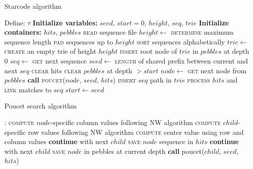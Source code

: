\documentclass[10pt,onecolumn]{article}
\begin{document}
\begin{algorithm}
  \caption{Starcode algorithm}
  \label{alg:starcode}
  \begin{algorithmic}[1]
    \State Define: $\tau$
    \State \textbf{Initialize variables:} $seed$, $start = 0$,
    $height$, $seq$, $trie$
    \State \textbf{Initialize containers:} $hits$, $pebbles$
    \State \textsc{read} sequence file
    \State $height \gets$ \textsc{determine} maximum sequence length
    \State \textsc{pad} sequences up to $height$
    \State \textsc{sort} sequences alphabetically
    \State $trie \gets$ \textsc{create} an empty trie of height $height$
    \State \textsc{insert} root node of $trie$ in $pebbles$ at depth 0
    \State $seq \gets$ \textsc{get} next sequence
    \State $seed \gets$ \textsc{length} of shared prefix
    between current and next $seq$
    \State \textsc{clear} hits
    \State \textsc{clear} $pebbles$ at depth $>start$
    \State $node \gets$ \textsc{get} next node from $pebbles$
    \State \textbf{call} \textsc{poucet}($node$, $seed$, $hits$)
    \EndFor
    \State \textsc{insert} $seq$ path in $trie$
    \State \textsc{process} $hits$ and \textsc{link} matches to $seq$
    \State $start \gets seed$
    \EndFor
  \end{algorithmic}
\end{algorithm}


\begin{algorithm}
  \caption{Poucet search algorithm}
  \label{alg:poucet}
  \begin{algorithmic}[1]
    :
    \State \textsc{compute} $node$-specific column values following NW algorithm
    \State \textsc{compute} $child$-specific row values following NW algorithm
    \State \textsc{compute} center value using row and column
    values
     
    \State \textbf{continue} with next $child$
    \EndIf
     
    \State \textsc{save} $node$ sequence in $hits$
    \State \textbf{continue} with next $child$
    \EndIf
    \State \textsc{save} $node$ in pebbles at current depth
    \EndIf
    \State \textbf{call} poucet($child$, $seed$, $hits$)
    \EndFor
    \EndProcedure
  \end{algorithmic}
\end{algorithm}
\end{document}
